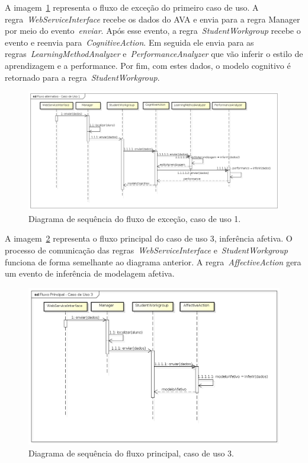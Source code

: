 A imagem~\ref{fig:dss-uc1-fluxo-alternativo} representa o fluxo de exceção do primeiro caso de uso. A regra~\emph{WebServiceInterface} recebe os dados do AVA e envia para a regra Manager por meio do evento~\emph{enviar}. Após esse evento, a regra~\emph{StudentWorkgroup} recebe o evento e reenvia para~\emph{CognitiveAction}. Em seguida ele envia para as regras~\emph{LearningMethodAnalyzer} e~\emph{PerformanceAnalyzer} que vão inferir o estilo de aprendizagem e a performance. Por fim, com estes dados, o modelo cognitivo é retornado para a regra~\emph{StudentWorkgroup}.

\begin{figure}
	\centering
	\includegraphics[scale=0.48]{images/dss-uc1-fluxo-alternativo}
	\caption{Diagrama de sequência do fluxo de exceção, caso de uso 1.}
	\label{fig:dss-uc1-fluxo-alternativo}
\end{figure}

A imagem~\ref{fig:dss-uc3-fluxo-principal} representa o fluxo principal do caso de uso 3, inferência afetiva. O processo de comunicação das regras~\emph{WebServiceInterface} e~\emph{StudentWorkgroup} funciona de forma semelhante ao diagrama anterior. A regra~\emph{AffectiveAction} gera um evento de inferência de modelagem afetiva.

\begin{figure}
	\centering
	\includegraphics[scale=0.48]{images/dss-uc3-fluxo-principal.png}
	\caption{Diagrama de sequência do fluxo principal, caso de uso 3.}
	\label{fig:dss-uc3-fluxo-principal}
\end{figure}


